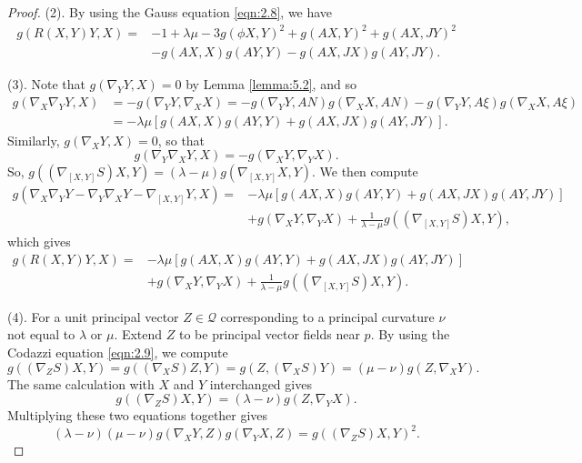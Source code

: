 \documentclass[reqno]{amsart}%
\theoremstyle{definition}
\numberwithin{equation}{section}
\begin{document}
\begin{proof}
(2). By using the Gauss equation \eqref{eqn:2.8}, we have
%
\begin{equation}\label{eqn:5.2}
\begin{aligned}
g(R(X,Y)Y,X)=&-1+\lambda\mu-3g(\phi X,Y)^2+g(AX,Y)^2+g(AX,JY)^2\\
&-g(AX,X)g(AY,Y)-g(AX,JX)g(AY,JY).
\end{aligned}
\end{equation}

(3). Note that $g(\nabla_Y Y,X)=0$ by Lemma \ref{lemma:5.2}, and so
$$
\begin{aligned}
g(\nabla_X {\nabla_Y Y},X)&=-g(\nabla_Y Y,\nabla_X X)=-g(\nabla_Y Y,AN)g(\nabla_X X,AN)-g(\nabla_Y Y,A\xi)g(\nabla_X X,A\xi)\\
&=-\lambda\mu [g(AX,X)g(AY,Y)+g(AX,JX)g(AY,JY)].
\end{aligned}
$$
Similarly, $g(\nabla_X Y,X)=0$, so that
$$
g(\nabla_Y {\nabla_X Y},X)=-g(\nabla_X Y,\nabla_Y X).
$$
So, $g((\nabla_{[X,Y]} S)X,Y)=(\lambda-\mu)g(\nabla_{[X,Y]} X,Y)$. We then compute
$$
\begin{aligned}
g(\nabla_X{\nabla_Y Y}-\nabla_Y {\nabla_X Y}-\nabla_{[X,Y]} Y,X)=&-\lambda\mu [g(AX,X)g(AY,Y)+g(AX,JX)g(AY,JY)]\\
&+g(\nabla_X Y,\nabla_Y X)
+\frac{1}{\lambda-\mu}g((\nabla_{[X,Y]} S)X,Y),
\end{aligned}
$$
which gives
\begin{equation}\label{eqn:5.3}
\begin{aligned}
g(R(X,Y)Y,X)=&-\lambda\mu[g(AX,X)g(AY,Y)+g(AX,JX)g(AY,JY)]\\
&+g(\nabla_X Y,\nabla_Y X)+\frac{1}{\lambda-\mu}g((\nabla_{[X,Y]} S)X,Y).
\end{aligned}
\end{equation}

(4). For a unit principal vector $Z\in \mathcal{Q}$
corresponding to a principal curvature $\nu$ not equal to $\lambda$ or $\mu$. Extend $Z$ to be principal vector fields near $p$.
By using the Codazzi equation \eqref{eqn:2.9}, we compute
$$
g((\nabla_Z S)X,Y)=g((\nabla_X S)Z,Y)=g(Z,(\nabla_X S)Y)=(\mu-\nu)g(Z,\nabla_X Y).
$$
The same calculation with $X$ and $Y$ interchanged gives
$$
g((\nabla_Z S)X,Y)=(\lambda-\nu)g(Z,\nabla_Y X).
$$
Multiplying these two equations together gives
%
\begin{equation}\label{eqn:5.4}
(\lambda-\nu)(\mu-\nu)g(\nabla_X Y,Z)g(\nabla_Y X,Z)=g((\nabla_Z S)X,Y)^2.
\end{equation}


\end{proof}
\end{document}
